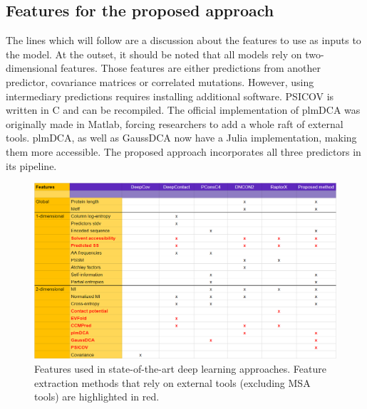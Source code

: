     \subsection{Features for the proposed approach}

        The lines which will follow are a discussion about the features to use as inputs
        to the model. At the outset, it should be noted that all models rely on
        two-dimensional features. Those features are either predictions from another
        predictor, covariance matrices or correlated mutations.
        However, using intermediary predictions requires installing additional software.
        PSICOV is written in C and can be recompiled. The official implementation of
        plmDCA was originally made in Matlab, forcing researchers to add a whole raft
        of external tools. plmDCA, as well as GaussDCA now have a Julia implementation,
        making them more accessible. The proposed approach incorporates all three
        predictors in its pipeline.

        \todo{}

        \begin{figure}[H]
            \begin{center}
                \includegraphics[width=\textwidth, keepaspectratio]{imgs/features.png}
                \caption{Features used in state-of-the-art deep learning approaches.
                Feature extraction methods that rely on external tools (excluding
                MSA tools) are highlighted in red.}
                \label{features}
            \end{center}
        \end{figure}
        